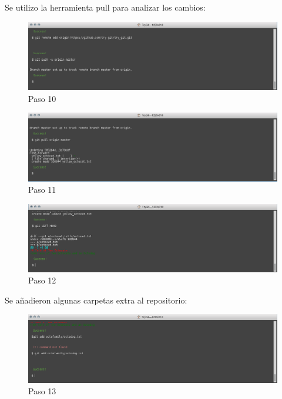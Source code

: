 \documentclass[11pt]{article}
\begin{document}
Se utilizo la herramienta pull para analizar los cambios:

\begin{figure}[H]
\centering
\includegraphics[scale=0.8]{img/10.png}
\caption{Paso 10}
\label{fig:10}
\end{figure}

\begin{figure}[H]
\centering
\includegraphics[scale=0.8]{img/11.png}
\caption{Paso 11}
\label{fig:11}
\end{figure}



\begin{figure}[H]
\centering
\includegraphics[scale=0.8]{img/12.png}
\caption{Paso 12}
\label{fig:12}
\end{figure}

Se añadieron algunas carpetas extra al repositorio:

\begin{figure}[H]
\centering
\includegraphics[scale=0.8]{img/13.png}
\caption{Paso 13}
\label{fig:13}
\end{figure}
\end{document}
